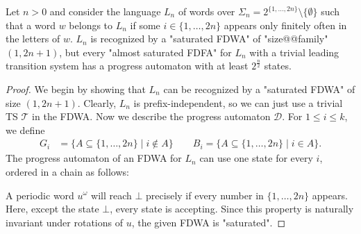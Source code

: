 \documentclass[a4paper,USenglish,cleveref,autoref,thm-restate]{lipics-v2021}
\newcommand{\mc}[1]{\ensuremath{\mathcal{#1}}}
\newcommand{\T}{\mc{T}}
\newcommand{\D}{\mc{D}}
\newcommand{\eps}{\ensuremath{\varepsilon}}
\begin{document}
{\begin{lemma}
    Let $n > 0$ and consider the language $L_n$ of words over $\Sigma_n = 2^{\{1,\dots,2n\}} \setminus \{\emptyset\}$ such that a word $w$ belongs to $L_n$ if some $i \in \{1,\dots,2n\}$ appears only finitely often in the letters of $w$.
    $L_n$ is recognized by a "saturated FDWA" of "size@@family" $(1,2n+1)$, but every "almost saturated FDFA" for $L_n$ with a trivial leading transition system has a progress automaton with at least $2^{\frac{n}{2}}$ states.
    \label{helper:incomparableSatFDWAalsatFDFA:first}
\end{lemma}
\begin{proof}
  We begin by showing that $L_n$ can be recognized by a "saturated FDWA" of size $(1,2n+1)$.
  Clearly, $L_n$ is prefix-independent, so we can just use a trivial TS $\T$ in the FDWA. 
  Now we describe the progress automaton $\D$.
  For $1 \leq i \leq k$, we define
  \begin{align*}
    G_i & = \{A \subseteq \{1,\dotsc,2n\} \mid i \notin A\} \qquad B_i = \{A \subseteq \{1,\dots,2n\} \mid i \in A\}.
  \end{align*}
  The progress automaton of an FDWA for $L_n$ can use one state for every $i$, ordered in a chain as follows:


\begin{figure}[ht]
    \centering
  \end{figure}
A periodic word $u^\omega$ will reach $\bot$ precisely if every number in $\{1,\dots,2n\}$ appears.
  Here, except the state $\bot$, every state is accepting.
  Since this property is naturally invariant under rotations of $u$, the given FDWA is "saturated".


\end{proof}}
\end{document}
